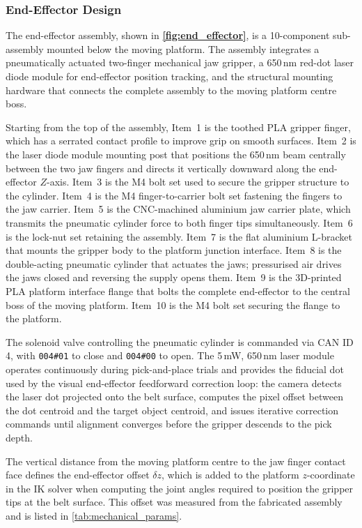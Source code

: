 \subsubsection{End-Effector Design}
\hspace{1.27cm}
The end-effector assembly, shown in
\textbf{\autoref{fig:end_effector}}, is a 10-component
sub-assembly mounted below the moving platform. The assembly
integrates a pneumatically actuated two-finger mechanical jaw
gripper, a 650\,nm red-dot laser diode module for end-effector
position tracking, and the structural mounting hardware that
connects the complete assembly to the moving platform centre
boss.\par
\hspace{1.27cm}
Starting from the top of the assembly, Item~1 is the toothed
PLA gripper finger, which has a serrated contact profile to
improve grip on smooth surfaces. Item~2 is the laser diode
module mounting post that positions the 650\,nm beam centrally
between the two jaw fingers and directs it vertically downward
along the end-effector $Z$-axis. Item~3 is the M4 bolt set
used to secure the gripper structure to the cylinder. Item~4
is the M4 finger-to-carrier bolt set fastening the fingers
to the jaw carrier. Item~5 is the CNC-machined aluminium jaw
carrier plate, which transmits the pneumatic cylinder force to
both finger tips simultaneously. Item~6 is the lock-nut set
retaining the assembly. Item~7 is the flat aluminium L-bracket
that mounts the gripper body to the platform junction interface.
Item~8 is the double-acting pneumatic cylinder that actuates
the jaws; pressurised air drives the jaws closed and reversing
the supply opens them. Item~9 is the 3D-printed PLA platform
interface flange that bolts the complete end-effector to the
central boss of the moving platform. Item~10 is the M4 bolt
set securing the flange to the platform.\par
\hspace{1.27cm}
The solenoid valve controlling the pneumatic cylinder is
commanded via CAN ID\,4, with \texttt{004\#01} to close and
\texttt{004\#00} to open. The 5\,mW, 650\,nm laser module
operates continuously during pick-and-place trials and
provides the fiducial dot used by the visual end-effector
feedforward correction loop: the camera detects the laser dot
projected onto the belt surface, computes the pixel offset
between the dot centroid and the target object centroid, and
issues iterative correction commands until alignment converges
before the gripper descends to the pick depth.\par
\hspace{1.27cm}
The vertical distance from the moving platform centre to the
jaw finger contact face defines the end-effector offset
$\delta z$, which is added to the platform $z$-coordinate in
the IK solver when computing the joint angles required to
position the gripper tips at the belt surface. This offset
was measured from the fabricated assembly and is listed in
\autoref{tab:mechanical_params}.

